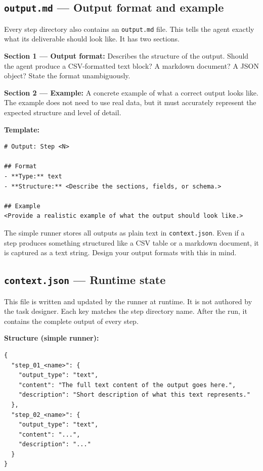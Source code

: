 \documentclass[12pt, a4paper]{article}
\begin{document}
\subsection{\texttt{output.md} --- Output format and example}

Every step directory also contains an \texttt{output.md} file. This tells the agent exactly what its deliverable should look like. It has two sections.

\textbf{Section 1 --- Output format:} Describes the structure of the output. Should the agent produce a CSV-formatted text block? A markdown document? A JSON object? State the format unambiguously.

\textbf{Section 2 --- Example:} A concrete example of what a correct output looks like. The example does not need to use real data, but it must accurately represent the expected structure and level of detail.

\textbf{Template:}

\begin{lstlisting}[language={}]
# Output: Step <N>

## Format
- **Type:** text
- **Structure:** <Describe the sections, fields, or schema.>

## Example
<Provide a realistic example of what the output should look like.>
\end{lstlisting}

\begin{notebox}
The simple runner stores all outputs as plain text in \texttt{context.json}. Even if a step produces something structured like a CSV table or a markdown document, it is captured as a text string. Design your output formats with this in mind.
\end{notebox}

\subsection{\texttt{context.json} --- Runtime state}

This file is written and updated by the runner at runtime. It is not authored by the task designer. Each key matches the step directory name. After the run, it contains the complete output of every step.

\textbf{Structure (simple runner):}

\begin{lstlisting}[language={}]
{
  "step_01_<name>": {
    "output_type": "text",
    "content": "The full text content of the output goes here.",
    "description": "Short description of what this text represents."
  },
  "step_02_<name>": {
    "output_type": "text",
    "content": "...",
    "description": "..."
  }
}
\end{lstlisting}
\end{document}
